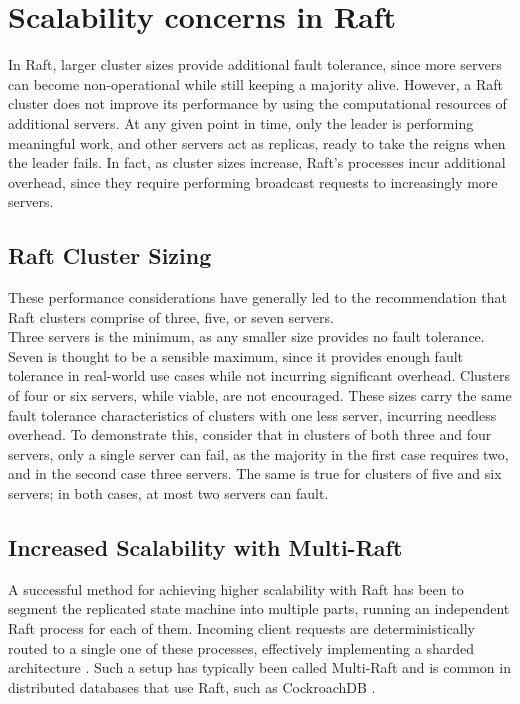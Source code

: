 \section{Scalability concerns in Raft} \label{scalabilirt-raft-multi-raft}

In Raft, larger cluster sizes provide additional fault tolerance, since more servers can become non-operational while still keeping a majority alive. However, a Raft cluster does not improve its performance by using the computational resources of additional servers. At any given point in time, only the leader is performing meaningful work, and other servers act as replicas, ready to take the reigns when the leader fails. In fact, as cluster sizes increase, Raft's processes incur additional overhead, since they require performing broadcast requests to increasingly more servers. 

\subsection{Raft Cluster Sizing}

These performance considerations have generally led to the recommendation that Raft clusters comprise of three, five, or seven servers.\\ 

Three servers is the minimum, as any smaller size provides no fault tolerance. Seven is thought to be a sensible maximum, since it provides enough fault tolerance in real-world use cases while not incurring significant overhead. Clusters of four or six servers, while viable, are not encouraged. These sizes carry the same fault tolerance characteristics of clusters with one less server, incurring needless overhead. To demonstrate this, consider that in clusters of both three and four servers, only a single server can fail, as the majority in the first case requires two, and in the second case three servers. The same is true for clusters of five and six servers; in both cases, at most two servers can fault.\\

\subsection{Increased Scalability with Multi-Raft}

A successful method for achieving higher scalability with Raft has been to segment the replicated state machine into multiple parts, running an independent Raft process for each of them. Incoming client requests are deterministically routed to a single one of these processes, effectively implementing a sharded architecture \cite{solat2024sharding}.
Such a setup has typically been called Multi-Raft and is common in distributed databases that use Raft, such as CockroachDB \cite{cockroachDb-multi-raft}.\\

